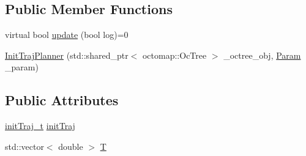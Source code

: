 \subsection*{Public Member Functions}
\begin{DoxyCompactItemize}
\item 
virtual bool \hyperlink{classlib_corridor_gen_1_1_init_traj_planner_acfc10a68eddb236a10790c4d92473d99}{update} (bool log)=0
\item 
\hyperlink{classlib_corridor_gen_1_1_init_traj_planner_a0ed77a8c723523592a3c2281dc576b17}{Init\+Traj\+Planner} (std\+::shared\+\_\+ptr$<$ octomap\+::\+Oc\+Tree $>$ \+\_\+octree\+\_\+obj, \hyperlink{classlib_corridor_gen_1_1_param}{Param} \+\_\+param)
\end{DoxyCompactItemize}
\subsection*{Public Attributes}
\begin{DoxyCompactItemize}
\item 
\hyperlink{corridor__common_8hpp_a5505ba29bfa7d0966513cc22822f80f0}{init\+Traj\+\_\+t} \hyperlink{classlib_corridor_gen_1_1_init_traj_planner_a26893ea85eb9d4270ff6920a5c9804a4}{init\+Traj}
\item 
std\+::vector$<$ double $>$ \hyperlink{classlib_corridor_gen_1_1_init_traj_planner_a245efac6cad8f5cac6a09c99dcaf8cbd}{T}
\end{DoxyCompactItemize}
